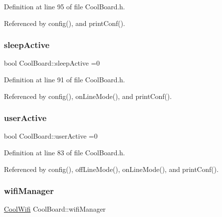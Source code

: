 Definition at line 95 of file Cool\+Board.\+h.



Referenced by config(), and print\+Conf().

\mbox{\label{classCoolBoard_a0a51b2287139f66c738101fb53139230}} 
\subsubsection{\texorpdfstring{sleep\+Active}{sleepActive}}
{\footnotesize\ttfamily bool Cool\+Board\+::sleep\+Active =0\hspace{0.3cm}{\ttfamily [private]}}



Definition at line 91 of file Cool\+Board.\+h.



Referenced by config(), on\+Line\+Mode(), and print\+Conf().

\mbox{\label{classCoolBoard_a6395459131d6889a3005f79c7a35e964}} 
\subsubsection{\texorpdfstring{user\+Active}{userActive}}
{\footnotesize\ttfamily bool Cool\+Board\+::user\+Active =0\hspace{0.3cm}{\ttfamily [private]}}



Definition at line 83 of file Cool\+Board.\+h.



Referenced by config(), off\+Line\+Mode(), on\+Line\+Mode(), and print\+Conf().

\mbox{\label{classCoolBoard_acd88e6003606b47479ebba81e4aceeca}} 
\subsubsection{\texorpdfstring{wifi\+Manager}{wifiManager}}
{\footnotesize\ttfamily \hyperlink{classCoolWifi}{Cool\+Wifi} Cool\+Board\+::wifi\+Manager\hspace{0.3cm}{\ttfamily [private]}}



